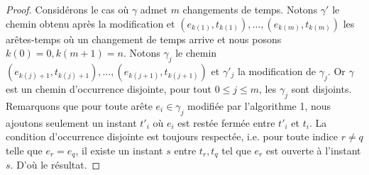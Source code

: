 \documentclass[titlepage,a4paper,12pt]{article}
\newcounter{thm}
\newcounter{algo}
\begin{document}
\begin{proof}
Considérons le cas où $\gamma$ admet $m$ changements de temps. Notons $\gamma'$ le chemin obtenu après la modification et $(e_{k(1)},t_{k(1)}),\dots,(e_{k(m)},t_{k(m)})$ les arêtes-temps où un changement de temps arrive et nous posons $k(0) = 0,k(m+1)=n$. Notons $\gamma_j$ le chemin $(e_{k(j)+1},t_{k(j)+1}),\dots,(e_{k(j+1)},t_{k(j+1)})$ et $\gamma'_j$ la modification de $\gamma_j$. Or $\gamma$ est un chemin d'occurrence disjointe, pour tout $0\leqslant j \leqslant m$, les $\gamma_j$ sont disjoints. Remarquons que pour toute arête $e_i\in \gamma_j$ modifiée par l'algorithme 1, nous ajoutons seulement un instant $t'_i$ où $e_i$ est restée fermée entre $t'_i$ et $t_i$. La condition d'occurrence disjointe est toujours respectée, i.e. pour toute indice $r \neq q$ telle que $e_r = e_q$, il existe un instant $s$ entre $t_r,t_q$ tel que $e_r$ est ouverte à l'instant $s$. D'où le résultat.
\end{proof}
\end{document}

